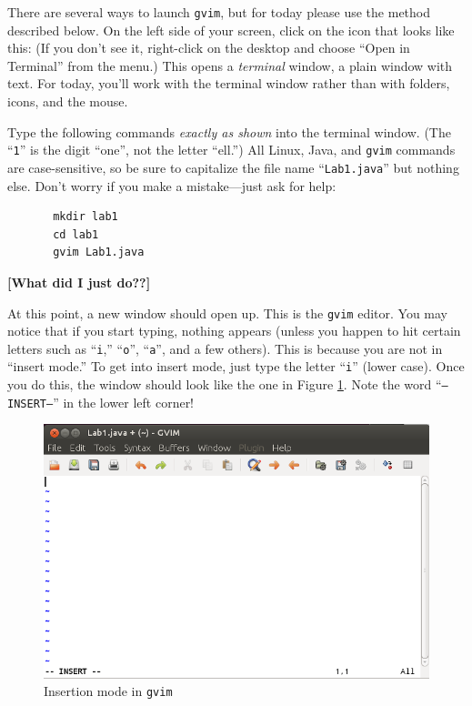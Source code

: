There are several ways to launch {\tt gvim}, but for today please use the
method described below.
On the left side of your screen, click on the icon that looks like this:
(If you don't see it, right-click on the desktop and choose ``Open in
Terminal'' from the menu.)  This opens a
{\em terminal} window, a plain window with text. For today, you'll work
with the terminal window rather than with folders, icons, and the mouse.

Type the following commands {\em exactly as shown} into the terminal window. 
(The ``{\tt 1}'' is the digit ``one'', not the letter ``ell.'') All Linux, Java, 
and {\tt gvim}
commands are case-sensitive, so be sure to capitalize the file name 
``{\tt Lab1.java}'' but nothing else.
Don't worry if you make a mistake---just ask for help:
\begin{verbatim}
       mkdir lab1
       cd lab1
       gvim Lab1.java
\end{verbatim}
{\color{red}\bf [What did I just do??]}

At this point, a new window should open up. This is the {\tt gvim} editor.
You may notice that if you start typing, nothing appears (unless you happen to
hit certain letters such as ``{\tt i},'' ``{\tt o}'', ``{\tt a}'', and a few
others). This is because you are not in ``insert mode.'' To get into insert mode,
just type the letter ``{\tt i}'' (lower case). Once you do this, the window should 
look like the one in Figure \ref{gvim-insert}. Note the word ``{\tt --INSERT--}''
in the lower left corner!

\begin{figure}[htbp]
\centering
\includegraphics[width=4.5in]{images/gvim-insert}
\caption{Insertion mode in {\tt gvim}}
\label{gvim-insert}
\end{figure}

